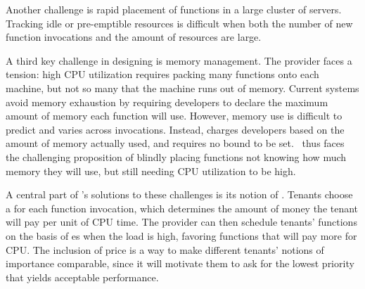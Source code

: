 Another challenge is rapid placement of functions in a large cluster of servers.
Tracking idle or pre-emptible resources is difficult when both the number of new
function invocations and the amount of resources are large.

A third key challenge in designing \sys{} is memory management. The provider
faces a tension: high CPU utilization requires packing many functions onto each
machine, but not so many that the machine runs out of memory. Current systems
avoid memory exhaustion by requiring developers to declare the maximum amount of
memory each function will use. However, memory use is difficult to predict and
varies across invocations. Instead, \sys{} charges developers based on the
amount of memory actually used, and requires no bound to be set.~\Sys{} thus
faces the challenging proposition of blindly placing functions not knowing how
much memory they will use, but still needing CPU utilization to be high.

A central part of {\sys}'s solutions to these challenges is its notion
of \emph{\priceclass{}}. Tenants choose a {\priceclass} for each
function invocation, which determines the amount of money the tenant
will pay per unit of CPU time. The provider can then schedule tenants'
functions on the basis of \priceclass{}es when the load is high,
favoring functions that will pay more for CPU. The inclusion of price
is a way to make different tenants' notions of importance comparable,
since it will motivate them to ask for the lowest priority that yields
acceptable performance.
